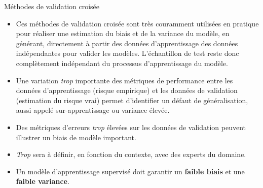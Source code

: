 \begin{frame}{Méthodes de validation croisée}
	\begin{itemize}
		\item Ces méthodes de validation croisée sont très couramment utilisées en pratique pour réaliser une estimation du biais et de la variance du modèle, en générant, directement à partir des données d'apprentissage des données indépendantes pour valider les modèles. L'échantillon de test reste donc complètement indépendant du processus d'apprentissage du modèle.
		\pause
		\item Une variation \textit{trop} importante des métriques de performance entre les données d'apprentissage (risque empirique) et les données de validation (estimation du risque vrai) permet d'identifier un défaut de généralisation, aussi appelé sur-apprentissage ou variance élevée.
		\pause
		\item Des métriques d'erreurs \textit{trop} élevées sur les données de validation peuvent illustrer un biais de modèle important.
		\pause
		\item \textit{Trop} sera à définir, en fonction du contexte, avec des experts du domaine.
		\pause
		\item Un modèle d'apprentissage supervisé doit garantir un \textbf{faible biais} et une \textbf{faible variance}.
	\end{itemize}
\end{frame}
